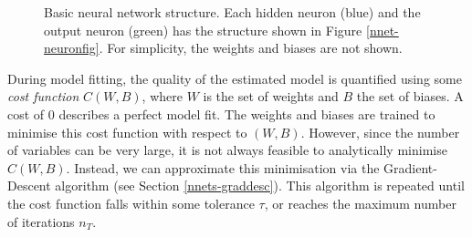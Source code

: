 \begin{figure}[hb]
\caption{Basic neural network structure. Each hidden neuron (blue) and the output neuron (green) has the structure shown in Figure \ref{nnet-neuronfig}. For simplicity, the weights and biases are not shown.}
\label{nnet-structurefig}
\end{figure}

During model fitting, the quality of the estimated model is quantified using some \textit{cost function} $C(W,B)$, where $W$ is the set of weights and $B$ the set of biases. A cost of 0 describes a perfect model fit. The weights and biases are trained to minimise this cost function with respect to $(W,B)$. However, since the number of variables can be very large, it is not always feasible to analytically minimise $C(W,B)$. Instead, we can approximate this minimisation via the Gradient-Descent algorithm (see Section \ref{nnets-graddesc}). This algorithm is repeated until the cost function falls within some tolerance $\tau$, or reaches the maximum number of iterations $n_T$.



